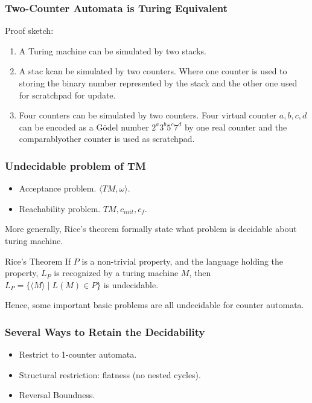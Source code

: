 \documentclass[11pt]{beamer}
\begin{document}
\begin{frame}\frametitle{Two-Counter Automata is Turing Equivalent}
Proof sketch:
\begin{enumerate}
\item A Turing machine can be simulated by two stacks.
\item A stac kcan be simulated by two counters. Where one counter is used to storing the binary number represented by the stack and the other one used for scratchpad for update. 

\item Four counters can be simulated by two counters. Four virtual counter $a,b,c,d$ can be encoded as a G\"odel number $2^a3^b5^c7^d$ by one real counter and the comparablyother counter is used as scratchpad.
\end{enumerate}
\end{frame}

\begin{frame}\frametitle{Undecidable problem of TM}
\begin{itemize}
\item Acceptance problem. $\langle TM, \omega\rangle$.
\item Reachability problem. $TM, c_{init}, c_{f}$.

\end{itemize}
More generally, Rice's theorem formally state what problem is decidable about turing machine.

\begin{theorem}{Rice's Theorem}
If $P$ is a non-trivial property, and the language holding the property, $L_P$ is recognized by a turing machine $M$, then $L_P = \{\langle M\rangle\mid L(M) \in P\}$ is undecidable.
\end{theorem}


Hence, some important basic problems are all undecidable for counter automata.
\end{frame}


\begin{frame}\frametitle{Several Ways to Retain the Decidability}
\begin{itemize}
\item Restrict to 1-counter automata.

\item Structural restriction: flatness (no nested cycles).

\item Reversal Boundness.
\end{itemize}
\end{frame}
\end{document}
